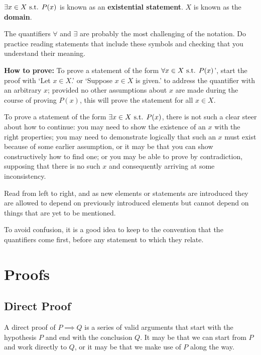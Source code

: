 $\exists x\in X \text{ s.t. } P(x)$ is known as an \textbf{existential statement}. $X$ is known as the \textbf{domain}.

The quantifiers $\forall$ and $\exists$ are probably the most challenging of the notation. Do practice reading statements that include these symbols and checking that you understand their meaning.

\textbf{How to prove:} To prove a statement of the form $\forall x \in X \text{ s.t. } P(x)$’, start the proof with ‘Let $x \in X$.’ or ‘Suppose $x \in X$ is given.’ to address the quantifier with an arbitrary $x$; provided no other assumptions about $x$ are made during the course of proving $P(x)$, this will prove the statement for all $x \in X$. 

To prove a statement of the form $\exists x \in X \text{ s.t. } P(x)$, there is not such a clear steer about how to continue: you may need to show the existence of an $x$ with the right properties; you may need to demonstrate logically that such an $x$ must exist because of some earlier assumption, or it may be that you can show constructively how to find one; or you may be able to prove by contradiction, supposing that there is no such $x$ and consequently arriving at some inconsistency.

\begin{remark}
Read from left to right, and as new elements or statements are introduced they are allowed to depend on previously introduced elements but cannot depend on things that are yet to be mentioned.
\end{remark}

\begin{remark}
To avoid confusion, it is a good idea to keep to the convention that the quantifiers come first, before any statement to which they relate.
\end{remark}
\pagebreak

\section{Proofs}
\subsection{Direct Proof}
A direct proof of $P \implies Q$ is a series of valid arguments that start with the hypothesis $P$ and end with the conclusion $Q$. It may be that we can start from $P$ and work directly to $Q$, or it may be that we make use of $P$ along the way.

